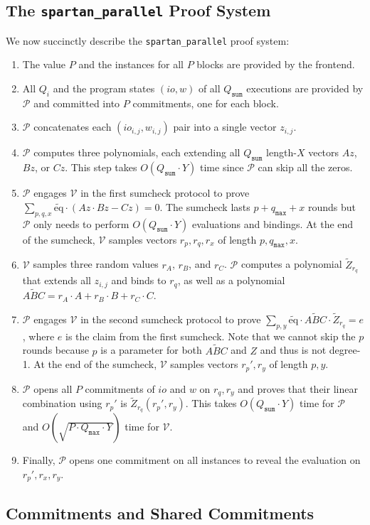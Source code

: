 \documentclass{article}
\newcommand{\code}{\texttt}
\newcommand{\Qsum}{Q_{\mathtt{sum}}}
\newcommand{\Qmax}{Q_{\mathtt{max}}}
\newcommand{\qmax}{q_{\mathtt{max}}}
\renewcommand{\P}{\mathcal{P}}
\newcommand{\V}{\mathcal{V}}
\newcommand{\Z}{\widetilde{Z}}
\newcommand{\ABC}{\widetilde{ABC}}
\newcommand{\eq}{\widetilde{\mbox{eq}}}
\begin{document}
\subsection{The \code{spartan\_parallel} Proof System}
We now succinctly describe the \code{spartan\_parallel} proof system:
\begin{enumerate}
    \item The value $P$ and the instances for all $P$ blocks are provided by the frontend.
    \item All $Q_i$ and the program states $(io, w)$ of all $\Qsum$ executions are provided by $\P$ and committed into $P$ commitments, one for each block.
    \item $\P$ concatenates each $(io_{i, j}, w_{i, j})$ pair into a single vector $z_{i, j}$.
    \item $\P$ computes three polynomials, each extending all $\Qsum$ length-$X$ vectors $Az$, $Bz$, or $Cz$. This step takes $O(\Qsum\cdot Y)$ time since $\P$ can skip all the zeros.
    \item $\P$ engages $\V$ in the first sumcheck protocol to prove $\sum_{p, q, x} \eq\cdot (Az \cdot Bz - Cz) = 0$. The sumcheck lasts $p + \qmax + x$ rounds but $\P$ only needs to perform $O(\Qsum\cdot Y)$ evaluations and bindings. At the end of the sumcheck, $\V$ samples vectors $r_p, r_q, r_x$ of length $p, \qmax, x$.
    \item $\V$ samples three random values $r_A$, $r_B$, and $r_C$. $\P$ computes a polynomial $\Z_{r_q}$ that extends all $z_{i, j}$ and binds to $r_q$, as well as a polynomial $\ABC = r_A\cdot A + r_B\cdot B + r_C\cdot C$.
    \item $\P$ engages $\V$ in the second sumcheck protocol to prove $\sum_{p, y} \eq\cdot \ABC \cdot \Z_{r_q} = e$, where $e$ is the claim from the first sumcheck. Note that we cannot skip the $p$ rounds because $p$ is a parameter for both $\ABC$ and $Z$ and thus is not degree-1. At the end of the sumcheck, $\V$ samples vectors $r_p', r_y$ of length $p, y$.
    \item $\P$ opens all $P$ commitments of $io$ and $w$ on $r_q, r_y$ and proves that their linear combination using $r_p'$ is $\Z_{r_q}(r_p', r_y)$. This takes $O(\Qsum\cdot Y)$ time for $\P$ and $O(\sqrt{P\cdot \Qmax\cdot Y})$ time for $\V$.
    \item Finally, $\P$ opens one commitment on all instances to reveal the evaluation on $r_p', r_x, r_y$.
\end{enumerate}

\subsection{Commitments and Shared Commitments}
\end{document}

